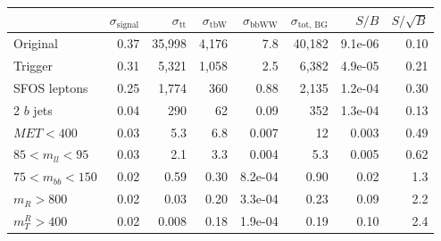 \begin{tabular}{lrrrrrrr}
\toprule
{} &  $\sigma_\text{signal}$ &  $\sigma_\text{tt}$ &  $\sigma_\text{tbW}$ &  $\sigma_\text{bbWW}$ &  $\sigma_\text{tot, BG}$ &   $S/B$ &  $S/\sqrt{B}$ \\
\midrule
Original            &               0.37 &         35,998 &           4,176 &              7.8 &              40,182 & 9.1e-06 &          0.10 \\
Trigger             &               0.31 &          5,321 &           1,058 &              2.5 &               6,382 & 4.9e-05 &          0.21 \\
SFOS leptons        &               0.25 &          1,774 &             360 &             0.88 &               2,135 & 1.2e-04 &          0.30 \\
2 $b$ jets          &               0.04 &            290 &              62 &             0.09 &                 352 & 1.3e-04 &          0.13 \\
$MET < 400$         &               0.03 &            5.3 &             6.8 &            0.007 &                  12 &   0.003 &          0.49 \\
$85 < m_{ll} < 95$  &               0.03 &            2.1 &             3.3 &            0.004 &                 5.3 &   0.005 &          0.62 \\
$75 < m_{bb} < 150$ &               0.02 &           0.59 &            0.30 &          8.2e-04 &                0.90 &    0.02 &           1.3 \\
$m_{R} > 800$       &               0.02 &           0.03 &            0.20 &          3.3e-04 &                0.23 &    0.09 &           2.2 \\
$m_{T}^{R} > 400$   &               0.02 &          0.008 &            0.18 &          1.9e-04 &                0.19 &    0.10 &           2.4 \\
\bottomrule
\end{tabular}
